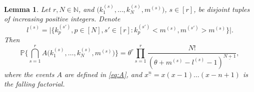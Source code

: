 \documentclass[11pt]{article}
\newcommand{\N}{\mathbb{N}}
\newcommand{\1}[1][]{
	\ifx&#1&\mathds{1}
	\else\mathds{1}\left\{#1\right\}\fi}
\newtheorem{lemma}{Lemma}[section]
\theoremstyle{definition}
\theoremstyle{remark}
\numberwithin{equation}{section}
\begin{document}
	\begin{lemma}
		\label{lem:1}
		Let $r,N \in \N$, and $\bigl(k_1^{(s)},\dots,k_N^{(s)}, m^{(s)}\bigr)$, $s\in [r]$, be disjoint tuples of increasing positive integers. Denote
		\begin{equation}
			\label{eq:ls}
			l^{(s)} = \bigl|\bigl\{k_p^{(s')},p\in[N],s'\in[r]:
			k_p^{(s')}<m^{(s)}, m^{(s')} > m^{(s)}\bigr\}\bigr|.
		\end{equation}
		Then
		\begin{equation}
			\label{eq:joint_prob}
			\mathbb{P}\biggl\{\bigcap_{s=1}^r A\bigl(k_1^{(s)}, \dots, k_N^{(s)}, m^{(s)}\bigr)\biggr\} = 
			\theta^r\prod_{s=1}^r \frac{N!}{\left(\theta + m^{(s)} - l^{(s)} - 1\right)^{\underline{N+1}}},
		\end{equation}
		where the events $A$ are defined in \eqref{eq:A}, and $x^{\underline n} = x (x-1) \ldots (x-n+1)$ is the falling factorial.
	\end{lemma}
\end{document}
